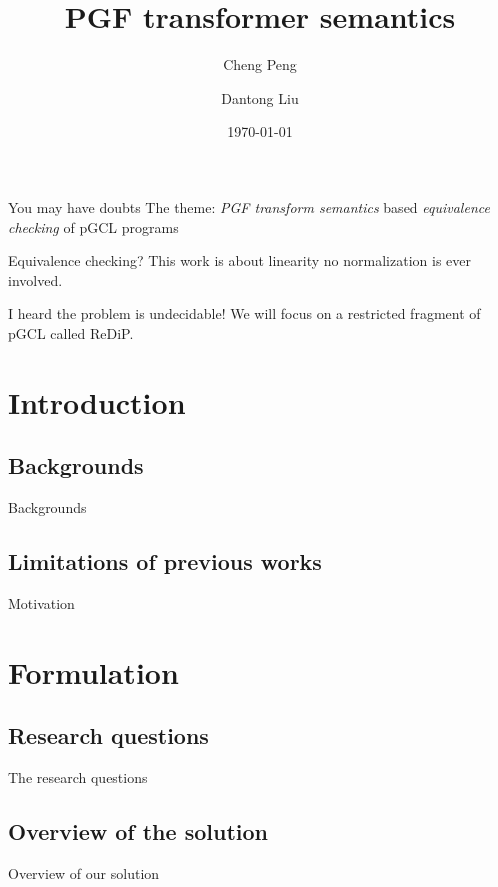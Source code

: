 \documentclass[11pt]{beamer}
\title{PGF transformer semantics}
\author{Cheng Peng \and Dantong Liu}
\date{\today}
\begin{document}
\maketitle
\begin{frame}{You may have doubts}
	The theme: \emph{PGF transform semantics} based \emph{equivalence checking} of pGCL programs

	\hfill

	\begin{block}{Equivalence checking?}
		This work is about linearity no normalization is ever involved.
	\end{block}

	\begin{block}{I heard the problem is undecidable!}
		We will focus on a restricted fragment of pGCL called ReDiP.
	\end{block}
\end{frame}

\section{Introduction}
\subsection{Backgrounds}
\begin{frame}{Backgrounds}

\end{frame}
\subsection{Limitations of previous works}
\begin{frame}{Motivation}

\end{frame}

\section{Formulation}
\subsection{Research questions}
\begin{frame}{The research questions}

\end{frame}
\subsection{Overview of the solution}
\begin{frame}{Overview of our solution}

\end{frame}
\end{document}
